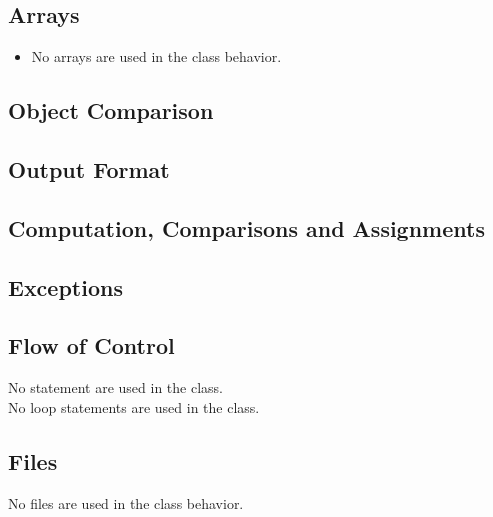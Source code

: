 \subsection{Arrays}
\begin{itemize}
	\item No arrays are used in the class behavior.
\end{itemize}
\subsection{Object Comparison}
\subsection{Output Format}
\subsection{Computation, Comparisons and Assignments}
\subsection{Exceptions}
\subsection{Flow of Control}
No  statement are used in the class.\\
No loop statements are used in the class.
\subsection{Files}
No files are used in the class behavior.
